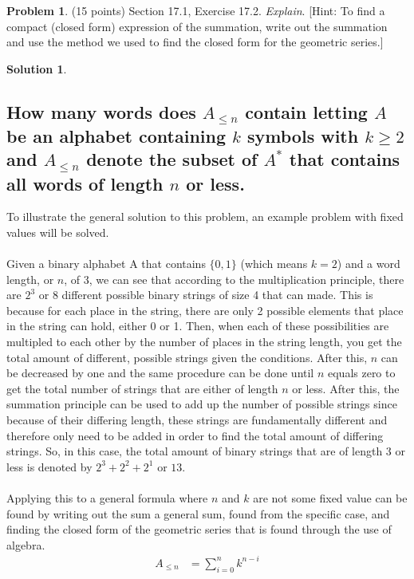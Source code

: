 \documentclass{article}
\theoremstyle{definition}
\newtheorem{problem}{Problem}
\newtheorem*{solution}{Solution}
\begin{document}
\newpage
\begin{problem} (15 points) Section 17.1, Exercise 17.2. \textit{Explain}.
[Hint: To find a compact (closed form) expression of the summation, write out the summation
and use the method we used to find the closed form for the geometric series.]
\end{problem}
\begin{solution}
\hspace{1cm}
\subsection*{How many words does $A_{\leqslant n}$ contain letting $A$ be an alphabet containing $k$ symbols with $k \geqslant 2$ and $A_{\leqslant n}$ denote the subset of $A^*$ that contains all words of length $n$ or less.}
To illustrate the general solution to this problem, an example problem with fixed values will be solved.\\\\
Given a binary alphabet A that contains $\{0,1\}$ (which means $k = 2$) and a word length, or $n$, of 3, we can see that according to the multiplication principle, there are $2^3$ or $8$ different possible binary strings of size 4 that can made. This is because for each place in the string, there are only 2 possible elements that place in the string can hold, either 0 or 1. Then, when each of these possibilities are multipled to each other by the number of places in the string length, you get the total amount of different, possible strings given the conditions. After this, $n$ can be decreased by one and the same procedure can be done until $n$ equals zero to get the total number of strings that are either of length $n$ or less. After this, the summation principle can be used to add up the number of possible strings since because of their differing length, these strings are fundamentally different and therefore only need to be added in order to find the total amount of differing strings. So, in this case, the total amount of binary strings that are of length 3 or less is denoted by $2^3 + 2^2 + 2^1$ or $13$.\\\\
Applying this to a general formula where $n$ and $k$ are not some fixed value can be found by writing out the sum a general sum, found from the specific case, and finding the closed form of the geometric series that is found through the use of algebra.
\begin{align*}
A_{\leqslant n} &= \sum_{i=0}^{n} k^{n-i}\\

\end{align*}
\end{solution}
\end{document}
